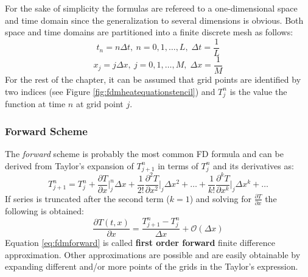 For the sake of simplicity the formulas are refereed to a one-dimensional space and time domain since the generalization to several dimensions is obvious.
Both space and time domains are partitioned into a finite discrete mesh as follows:    
 \begin{equation}
    		t_n = n\Delta t, \: n = 0,1,\ldots,L,\; \Delta t= \frac{1}{L}
    \end{equation}
    \begin{equation}
    		x_j = j\Delta x, \: j = 0,1,\ldots,M,\;\Delta x = \frac{1}{M}
    \end{equation}
For the rest of the chapter, it can be assumed that grid points are identified by two indices (see Figure \ref{fig:fdmheatequationstencil}) and $T_j^n$ is the value the function at time $n$ at grid point $j$.

\subsubsection{Forward Scheme}
    The \textit{forward} scheme is probably the most common FD formula and can be derived from Taylor's expansion of $T^n_{j+1}$ in terms of $T^n_{j}$ and its derivatives as:
    \begin{equation}
    T^n_{j+1} = T^n_{j} +
    \frac{\partial T}{\partial x}\bigg\rvert^n_j \Delta x +
    \frac{1}{2!}  \frac{\partial^2 T}{\partial x^2}\bigg\rvert_j \Delta x^2 + \ldots + 
     \frac{1}{k!}  \frac{\partial^k T}{\partial x^k}\bigg\rvert_j \Delta x^k + \ldots
     \label{eq:taylorexp1}
    \end{equation}    
    If series is truncated after the second term ($k=1$) and solving for $\frac{\partial T}{\partial x}$ the following is obtained:
    \begin{equation}
    \frac{\partial T(t,x)}{\partial x}  = \frac{T^n_{j+1} - T^n_{j}}{\Delta x} + \mathcal{O}(\Delta x)
    \label{eq:fdmforward}
    \end{equation}    
    Equation \ref{eq:fdmforward} is called \textbf{first order forward} finite difference approximation. Other approximations are possible and are easily obtainable by expanding different and/or more points of the grids in the Taylor's expression.
    
